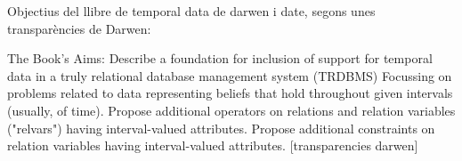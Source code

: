 

Objectius del llibre de temporal data de darwen i date, segons unes transparències de Darwen:

The Book’s Aims:
Describe a foundation for inclusion of support for temporal data in a truly
relational database management system (TRDBMS)
Focussing on problems related to data representing beliefs that hold throughout
given intervals (usually, of time).
Propose additional operators on relations and relation variables ("relvars")
having interval-valued attributes.
Propose additional constraints on relation variables having interval-valued
attributes.
[transparencies darwen]
